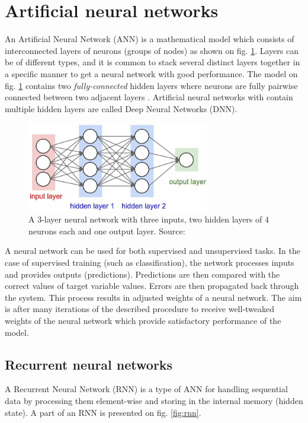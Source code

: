 \section{Artificial neural networks}
An Artificial Neural Network (ANN) is a mathematical model which consists of interconnected layers of neurons (groups of nodes) as shown on fig. \ref{fig:neural-net}. Layers can be of different types, and it is common to stack several distinct layers together in a specific manner to get a neural network with good performance. The model on fig. \ref{fig:neural-net} contains two \textit{fully-connected} hidden layers where neurons are fully pairwise connected between two adjacent layers \citep{FeiFei-2016}. Artificial neural networks with contain multiple hidden layers are called Deep Neural Networks (DNN). 

\begin{figure}[h]
    \centering
    \includegraphics[width=8cm]{Images/Neural-network.jpg}
    \caption{A 3-layer neural network with three inputs, two hidden layers of 4 neurons each and one output layer. Source: \citep{FeiFei-2016}}
    \label{fig:neural-net}
\end{figure} 

A neural network can be used for both supervised and unsupervised tasks. In the case of supervised training (such as classification), the network processes inputs and provides outputs (predictions). Predictions are then compared with the correct values of target variable values. Errors are then propagated back through the system. This process results in adjusted weights of a neural network. The aim is after many iterations of the described procedure to receive well-tweaked weights of the neural network which provide satisfactory performance of the model.

\subsection{Recurrent neural networks}
A Recurrent Neural Network (RNN) is a type of ANN for handling sequential data by processing them element-wise and storing in the internal memory (hidden state). A part of an RNN is presented on fig. \ref{fig:rnn}.

